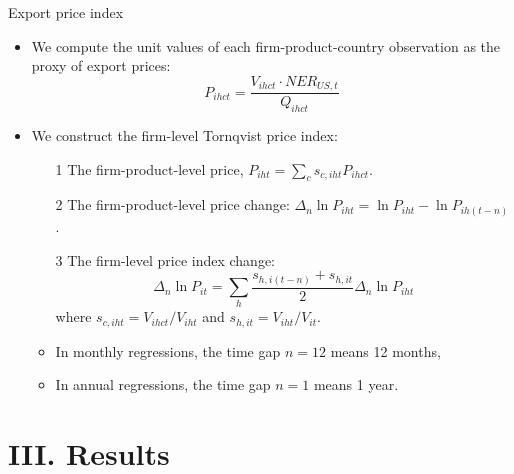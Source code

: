 \documentclass[10pt]{beamer}
\begin{document}
\begin{frame}{Export price index}
    \begin{itemize}
	\item We compute the unit values of each firm-product-country observation as the proxy of export prices:
        $$
        P_{ihct}=\frac{V_{ihct}\cdot NER_{US,t}}{Q_{ihct}}
        $$
        \item We construct the firm-level Tornqvist price index:
        \begin{itemize}
            \item [1] The firm-product-level price, $P_{iht}=\sum_c s_{c,iht} P_{ihct}$.
            \item [2] The firm-product-level price change: $\Delta_n \ln P_{iht} = \ln P_{iht}-\ln P_{ih(t-n)}$.
            \item [3] The firm-level price index change:
            $$
            \Delta_n \ln P_{it} = \sum _{h} \frac{s_{h,i(t-n)}+s_{h,it}}{2} \Delta_n \ln P_{iht}
            $$
            where $s_{c,iht}=V_{ihct}/V_{iht}$ and $s_{h,it}=V_{iht}/V_{it}$.
            \item In monthly regressions, the time gap $n=12$ means 12 months, 
            \item In annual regressions, the time gap $n=1$ means 1 year.
        \end{itemize}
    \end{itemize}
\end{frame}

\section{III. Results}
\end{document}
